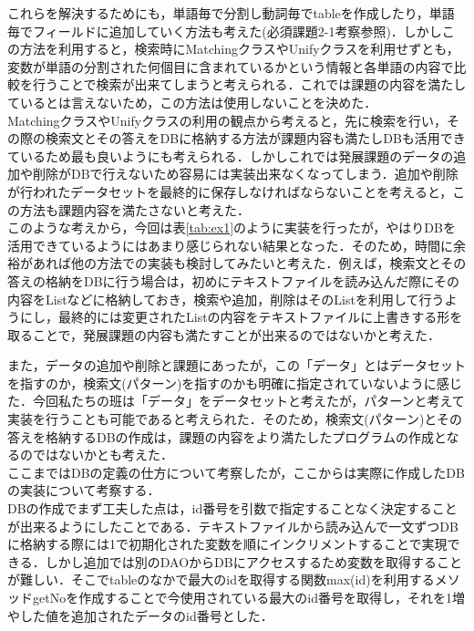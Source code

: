\documentclass[12pt]{jarticle}
\begin{document}
これらを解決するためにも，単語毎で分割し動詞毎でtableを作成したり，単語毎でフィールドに追加していく方法も考えた(必須課題2-1考察参照)．しかしこの方法を利用すると，検索時にMatchingクラスやUnifyクラスを利用せずとも，変数が単語の分割された何個目に含まれているかという情報と各単語の内容で比較を行うことで検索が出来てしまうと考えられる．これでは課題の内容を満たしているとは言えないため，この方法は使用しないことを決めた．\\

MatchingクラスやUnifyクラスの利用の観点から考えると，先に検索を行い，その際の検索文とその答えをDBに格納する方法が課題内容も満たしDBも活用できているため最も良いようにも考えられる．しかしこれでは発展課題のデータの追加や削除がDBで行えないため容易には実装出来なくなってしまう．追加や削除が行われたデータセットを最終的に保存しなければならないことを考えると，この方法も課題内容を満たさないと考えた．\\

このような考えから，今回は表\ref{tab:ex1}のように実装を行ったが，やはりDBを活用できているようにはあまり感じられない結果となった．そのため，時間に余裕があれば他の方法での実装も検討してみたいと考えた．例えば，検索文とその答えの格納をDBに行う場合は，初めにテキストファイルを読み込んだ際にその内容をListなどに格納しておき，検索や追加，削除はそのListを利用して行うようにし，最終的には変更されたListの内容をテキストファイルに上書きする形を取ることで，発展課題の内容も満たすことが出来るのではないかと考えた．\par
また，データの追加や削除と課題にあったが，この「データ」とはデータセットを指すのか，検索文(パターン)を指すのかも明確に指定されていないように感じた．今回私たちの班は「データ」をデータセットと考えたが，パターンと考えて実装を行うことも可能であると考えられた．そのため，検索文(パターン)とその答えを格納するDBの作成は，課題の内容をより満たしたプログラムの作成となるのではないかとも考えた．\\

ここまではDBの定義の仕方について考察したが，ここからは実際に作成したDBの実装について考察する．\\

DBの作成でまず工夫した点は，id番号を引数で指定することなく決定することが出来るようにしたことである．テキストファイルから読み込んで一文ずつDBに格納する際には1で初期化された変数を順にインクリメントすることで実現できる．しかし追加では別のDAOからDBにアクセスするため変数を取得することが難しい．そこでtableのなかで最大のidを取得する関数max(id)を利用するメソッドgetNoを作成することで今使用されている最大のid番号を取得し，それを1増やした値を追加されたデータのid番号とした．\\
\end{document}
